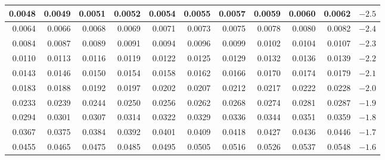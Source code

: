 \begin{table}[H]
\begin{center}
{\begin{tabular}{| rrrrr | rrrrr | c}
  \normalsize{0.0048} & \normalsize{0.0049} & \normalsize{0.0051} & \normalsize{0.0052} & \normalsize{0.0054} & \normalsize{0.0055} & \normalsize{0.0057} & \normalsize{0.0059} & \normalsize{0.0060} & \normalsize{0.0062} & $-2.5$ \\
    \hline
  \normalsize{0.0064} & \normalsize{0.0066} & \normalsize{0.0068} & \normalsize{0.0069} & \normalsize{0.0071} & \normalsize{0.0073} & \normalsize{0.0075} & \normalsize{0.0078} & \normalsize{0.0080} & \normalsize{0.0082} & $-2.4$ \\
  \normalsize{0.0084} & \normalsize{0.0087} & \normalsize{0.0089} & \normalsize{0.0091} & \normalsize{0.0094} & \normalsize{0.0096} & \normalsize{0.0099} & \normalsize{0.0102} & \normalsize{0.0104} & \normalsize{0.0107} & $-2.3$ \\
  \normalsize{0.0110} & \normalsize{0.0113} & \normalsize{0.0116} & \normalsize{0.0119} & \normalsize{0.0122} & \normalsize{0.0125} & \normalsize{0.0129} & \normalsize{0.0132} & \normalsize{0.0136} & \normalsize{0.0139} & $-2.2$ \\
  \normalsize{0.0143} & \normalsize{0.0146} & \normalsize{0.0150} & \normalsize{0.0154} & \normalsize{0.0158} & \normalsize{0.0162} & \normalsize{0.0166} & \normalsize{0.0170} & \normalsize{0.0174} & \normalsize{0.0179} & $-2.1$ \\
  \normalsize{0.0183} & \normalsize{0.0188} & \normalsize{0.0192} & \normalsize{0.0197} & \normalsize{0.0202} & \normalsize{0.0207} & \normalsize{0.0212} & \normalsize{0.0217} & \normalsize{0.0222} & \normalsize{0.0228} & $-2.0$ \\
    \hline
    \hline
  \normalsize{0.0233} & \normalsize{0.0239} & \normalsize{0.0244} & \normalsize{0.0250} & \normalsize{0.0256} & \normalsize{0.0262} & \normalsize{0.0268} & \normalsize{0.0274} & \normalsize{0.0281} & \normalsize{0.0287} & $-1.9$ \\
  \normalsize{0.0294} & \normalsize{0.0301} & \normalsize{0.0307} & \normalsize{0.0314} & \normalsize{0.0322} & \normalsize{0.0329} & \normalsize{0.0336} & \normalsize{0.0344} & \normalsize{0.0351} & \normalsize{0.0359} & $-1.8$ \\
  \normalsize{0.0367} & \normalsize{0.0375} & \normalsize{0.0384} & \normalsize{0.0392} & \normalsize{0.0401} & \normalsize{0.0409} & \normalsize{0.0418} & \normalsize{0.0427} & \normalsize{0.0436} & \normalsize{0.0446} & $-1.7$ \\
  \normalsize{0.0455} & \normalsize{0.0465} & \normalsize{0.0475} & \normalsize{0.0485} & \normalsize{0.0495} & \normalsize{0.0505} & \normalsize{0.0516} & \normalsize{0.0526} & \normalsize{0.0537} & \normalsize{0.0548} & $-1.6$ \\

\end{tabular}}
\end{center}
\end{table}
